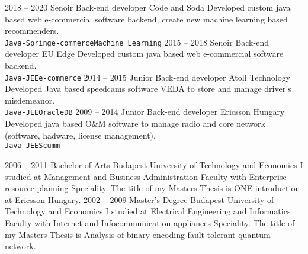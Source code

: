 \documentclass[9pt]{developercv} %
\begin{document}
\begin{entrylist}
	\entry
		{2018 -- 2020}
		{Senoir Back-end developer}
		{Code and Soda}
		{Developed custom java based web e-commercial software backend, create new machine learning based recommenders.\\ \texttt{Java-Spring}\slashsep\texttt{e-commerce}\slashsep\texttt{Machine Learning}}
	\entry
		{2015 -- 2018}
        {Senoir Back-end developer}
        {EU Edge}
        {Developed custom java based web e-commercial software backend.\\ \texttt{Java-JEE}\slashsep\texttt{e-commerce}}
	\entry
		{2014 -- 2015}
		{Junior Back-end developer}
		{Atoll Technology}
		{Developed Java based speedcams software VEDA to store and manage driver's misdemeanor.\\ 
		\texttt{Java-JEE}\slashsep\texttt{OracleDB}}
	\entry
        {2009 -- 2014}
        {Junior Back-end developer}
        {Ericsson Hungary}
        {Developed java based O\&M software to manage radio and core network (software, hadware, license management).\\ 
    	\texttt{Java-JEE}\slashsep\texttt{Scumm}}
\end{entrylist}



\begin{entrylist}
	\entry
    	{2006 -- 2011}
	    {Bachelor of Arts}
    	{Budapest University of Technology and Economics}
    	{I studied at Management and Business Administration Faculty with Enterprise resource planning Speciality. The title of my Masters Thesis is ONE introduction at Ericsson Hungary.}
	\entry
		{2002 -- 2009}
		{Master's Degree}
		{Budapest University of Technology and Economics}
		{I studied at Electrical Engineering and Informatics Faculty with Internet and Infocommunication appliances Speciality. The title of my Masters Thesis is Analysis of binary encoding fault-tolerant quantum network.}
\end{entrylist}

\end{document}
